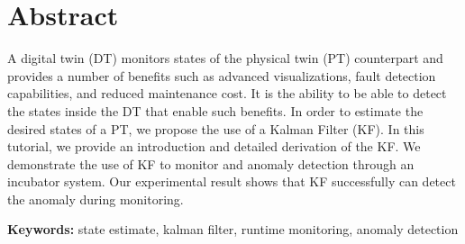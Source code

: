 \section*{Abstract}

A digital twin (DT) monitors states of the physical twin (PT) counterpart and provides a number of benefits such as advanced visualizations, fault detection capabilities, and reduced maintenance cost. It is the ability to be able to detect the states inside the DT that enable such benefits. In order to estimate the desired states of a PT, we propose the use of a Kalman Filter (KF). In this tutorial, we provide an introduction and detailed derivation of the KF. We demonstrate the use of KF to monitor and anomaly detection through an incubator system. Our experimental result shows that KF successfully can detect the anomaly during monitoring.

\textbf{Keywords:} state estimate, kalman filter, runtime monitoring, anomaly detection
